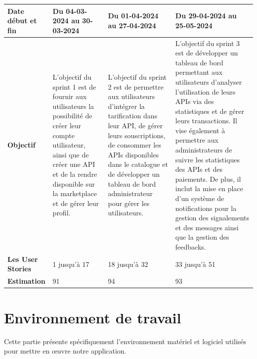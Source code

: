 \begin{longtable}[c]{
    |p{}
    |p{}
    |p{}
    |p{}|
    }
    \textbf{Date début et fin}        & Du 04-03-2024 au 30-03-2024 & Du 01-04-2024 au 27-04-2024 & Du 29-04-2024 au 25-05-2024                                                                                  \\
    \hline
    \textbf{Objectif}                                                                                                                                                                                                                                                    &
    L'objectif du sprint 1 est de fournir aux utilisateurs la possibilité de créer leur compte utilisateur, ainsi que de créer une API et de la rendre disponible sur la marketplace et de gérer leur profil.                                                            &
    L'objectif du sprint 2 est de permettre aux utilisateurs d'intégrer la tarification dans leur API, de gérer leurs souscriptions, de consommer les APIs disponibles dans le catalogue et de développer un tableau de bord administrateur pour gérer les utilisateurs. &
    L'objectif du sprint 3 est de développer un tableau de bord permettant aux utilisateurs d'analyser l'utilisation de leurs APIs via des statistiques et de gérer leurs transactions. Il vise également à permettre aux administrateurs de suivre les statistiques des APIs et des paiements. De plus, il inclut la mise en place d'un système de notifications pour la gestion des signalements et des messages ainsi que la gestion des feedbacks. \\
    \hline
    \textbf{Les User Stories}  & 1 jusqu’à 17   & 18 jusqu’à 32  & 33 jusqu’à  51                                                                                                 \\
    \hline
    \textbf{Estimation}   & 91    & 94       & 93                                                                                                          \\
    \hline
\end{longtable}

\section{Environnement de travail}
Cette partie présente spécifiquement l'environnement matériel et logiciel utilisés pour mettre en œuvre notre application.
